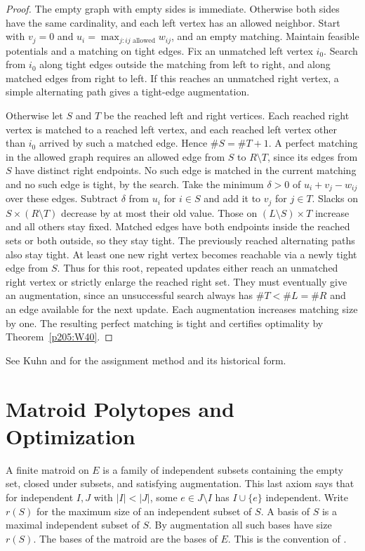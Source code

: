 \documentclass[11pt,oneside,openany]{book}
\theoremstyle{plain}
\theoremstyle{definition}
\theoremstyle{remark}
\begin{document}
\begin{proof}
The empty graph with empty sides is immediate. Otherwise both sides
have the same cardinality, and each left vertex has an allowed
neighbor. Start with \(v_j=0\) and
\(u_i=\max_{j:ij\text{ allowed}}w_{ij}\), and an empty matching.
Maintain feasible potentials and a matching on tight edges.
Fix an unmatched left vertex \(i_0\). Search from \(i_0\) along
tight edges outside the matching from left to right, and along
matched edges from right to left. If this reaches an unmatched
right vertex, a simple alternating path gives a tight-edge
augmentation.

Otherwise let \(S\) and \(T\) be the reached left and right vertices.
Each reached right vertex is matched to a reached left vertex, and
each reached left vertex other than \(i_0\) arrived by such a
matched edge. Hence \(\#S=\#T+1\). A perfect matching in the allowed
graph requires an allowed edge from \(S\) to \(R\setminus T\),
since its edges from \(S\) have distinct right endpoints.
No such edge is matched in the current matching and no such edge
is tight, by the search. Take the minimum \(\delta>0\) of
\(u_i+v_j-w_{ij}\) over these edges. Subtract \(\delta\) from
\(u_i\) for \(i\in S\) and add it to \(v_j\) for \(j\in T\).
Slacks on \(S\times(R\setminus T)\) decrease by at most their
old value. Those on \((L\setminus S)\times T\) increase and all
others stay fixed. Matched edges have both endpoints inside the
reached sets or both outside, so they stay tight.
The previously reached alternating paths also stay tight.
At least one new right vertex becomes reachable via a newly tight
edge from \(S\). Thus for this root, repeated updates either reach an
unmatched right vertex or strictly enlarge the reached right set.
They must eventually give an augmentation, since an unsuccessful
search always has \(\#T<\#L=\#R\) and an edge available for the next
update. Each augmentation increases matching size by one. The
resulting perfect matching is tight and certifies optimality by
Theorem~\ref{p205:W40}.
\end{proof}

See Kuhn \cite{kuhn} and \cite[vol.~A, Sections 17.2--17.3]{schrijver}
for the assignment method and its historical form.
\chapter{Matroid Polytopes and Optimization}
\label{p205:ch09}

A finite matroid on \(E\) is a family of independent subsets
containing the empty set, closed under subsets, and satisfying
augmentation. This last axiom says that for independent \(I,J\)
with \(|I|<|J|\), some \(e\in J\setminus I\) has \(I\cup\{e\}\)
independent. Write \(r(S)\) for the maximum size of an independent
subset of \(S\). A basis of \(S\) is a maximal independent subset of
\(S\). By augmentation all such bases have size \(r(S)\). The bases
of the matroid are the bases of \(E\).
This is the convention of \cite[Chapter~10, W64]{p204}.
\end{document}
